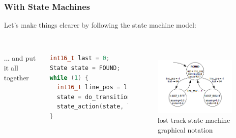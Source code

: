 \documentclass{beamer}
\begin{document}
\begin{frame}[fragile]
\frametitle{With State Machines}
Let's make things clearer by following the state machine model: \\
\hfill \\
\begin{columns}[t]
... and put it all together
\begin{lstlisting}[language=C++,basicstyle=\ttfamily\tiny]
int16_t last = 0;
State state = FOUND;
while (1) {
  int16_t line_pos = line_detect(camera_data);
  state = do_transition(state, line_pos, last);
  state_action(state, line_pos, last);
}
\end{lstlisting}

\begin{figure}[h!]
\includegraphics[width=1.0\columnwidth]{images/statemachine} \\
lost track state machine \\
graphical notation
\end{figure}
\end{columns}
\end{frame}
\end{document}
